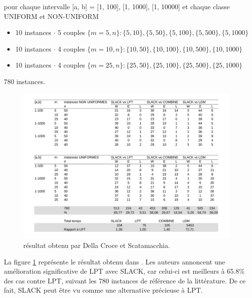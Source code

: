 \documentclass[a4paper,12pt]{report}
\theoremstyle{plain}				%
\theoremstyle{definition}				%
\begin{document}
pour chaque intervalle [a, b] = [1, 100], [1, 1000], [1, 10000] et
  chaque classe UNIFORM et NON-UNIFORM 
\begin{itemize}
\item 10 instances $\cdot$ 5 couples $\{m=5,n\}:\{5,10\},\{5,50\},\{5,100\},\{5,500\},\{5,1000\}$
\item 10 instances $\cdot$ 4 couples $\{m=10, n\}:\{10,50\},\{10,100\},\{10,500\},\{10,1000\}$
\item 10 instances $\cdot$ 4 couples $\{m=25,n\}:\{25,50\},\{25,100\},\{25,500\},\{25,1000\}$
\end{itemize}  

780 instances.

\begin{figure}
{\centering
\includegraphics[width=\columnwidth]{1_Resultat_De_DCS.pdf}
\caption{résultat obtenu par Della Croce et Scatamacchia.}
\label{fig:resultatDellaCroceScatamacchia}
\par}
\end{figure}

La figure \ref{fig:resultatDellaCroceScatamacchia} représente le résultat obtenu 
  dans \cite{della2020longest}. 
Les auteurs annoncent une amélioration significative de LPT avec SLACK, 
  car celui-ci est meilleurs à 65.8\% des cas contre LPT, suivant les 780 instances 
  de référence de la littérature. De ce fait, SLACK peut être vu comme une alternative précieuse 
  à LPT.
  
\end{document}
